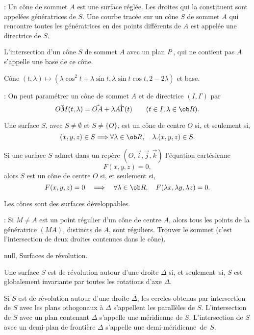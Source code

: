 \Remarque : Un cône de sommet $A$ est une surface réglée. \pn 
Les droites qui la constituent sont appelées génératrices de $S$. \pn
Une courbe tracée sur un cône $S$ de sommet $A$ 
qui rencontre toutes les génératrices en des points différents de $A$ 
est appelée une directrice de $S$. 
\bigskip

\Definition [] L'intersection d'un cône $S$ de sommet $A$ avec un plan $\sc P$, 
qui ne contient pas $A$ s'appelle une base de ce cône. 
\bigskip

\centerline{%
}%
\Figure [Index=Surfaces!Cone@Cône]  Cône 
$(t,\lambda)\mapsto (\lambda\cos^2t+\lambda\sin t, \lambda\sin t\cos t,2-2\lambda)$ et base.
\bigskip

\Remarque : On peut paramétrer un cône de sommet $A$ et de directrice $(I,\Gamma)$ par 
$$
\vec{OM}(t,\lambda)=\vec{OA}+\lambda\vec{A\Gamma}(t)\qquad(t\in I,\lambda\in\ob R).
$$

Une surface $S$, avec $S\neq\emptyset$ et $S\neq\{O\}$, est un cône de centre $O$ si, et seulement si, 
$$
(x,y,z)\in S\Longrightarrow \forall\lambda\in\ob R,\quad \lambda.(x,y,z)\in S.
$$

\Propriete [] Si une surface $S$ admet dans un repère $(O,\vec i,\vec j,\vec k)$ 
l'équation cartésienne  
$$
F(x,y,z)=0,
$$
alors $S$ est un cône de centre $O$ si, et seulement si, 
$$
F(x,y,z)=0\quad\Longrightarrow\quad \forall\lambda\in\ob R,\quad F(\lambda x,\lambda y,\lambda z)=0. 
$$

\Propriete 
Les cônes sont des surfaces développables. 

\Remarque : Si $M\neq A$ est un point régulier d'un cône de centre $A$, alors 
tous les points de la génératrice $(MA)$, distincts de $A$, sont réguliers. 
\bigskip
{}Trouver le sommet (c'est l'intersection de deux droites contenues dans le cône). 
\bigskip

\Subsection null, Surfaces de révolution.

\Definition [] Une surface $S$ est de révolution autour d'une droite $\Delta$ si, 
et seulement~si, 
$S$ est globalement invariante par toutes les rotations d'axe $\Delta$. 


\Definition [] Si $S$ est de révolution autour d'une droite $\Delta$, 
les cercles obtenus par intersection de $S$ avec les plans othogonaux à $\Delta$ s'appellent les parallèles de $S$. 
\pn
L'intersection de $S$ avec un plan contenant $\Delta$ s'appelle une méridienne de $S$. \pn
L'intersection de $S$ avec un demi-plan de frontière $\Delta$ s'appelle 
une demi-méridienne~de~$S$.

